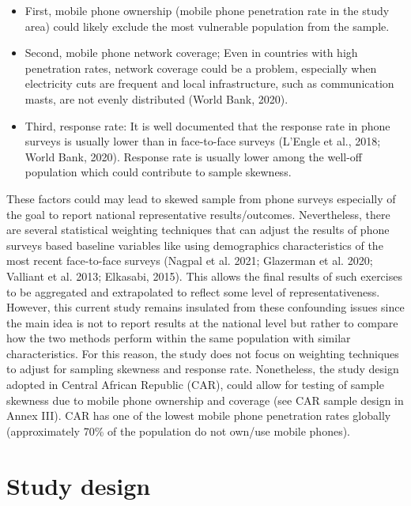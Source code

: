 \documentclass[11pt,harvard]{article}
\begin{document}
\begin{itemize}[label=--, left=1.5em]
\item[1]	First, mobile phone ownership (mobile phone penetration rate in the study area) could likely exclude the most vulnerable population from the sample. 

\item[2]	Second, mobile phone network coverage; Even in countries with high penetration rates, network coverage could be a problem, especially when electricity cuts are frequent and local infrastructure, such as communication masts, are not evenly distributed (World Bank, 2020).

\item[3]	Third, response rate: It is well documented that the response rate in phone surveys is usually lower than in face-to-face surveys (L’Engle et al., 2018; World Bank, 2020). Response rate is usually lower among the well-off population which could contribute to sample skewness.
\end{itemize}
 
These factors could may lead to skewed sample from phone surveys especially of the goal to report national representative results/outcomes. Nevertheless, there are several statistical weighting techniques that can adjust the results of phone surveys based baseline variables like using demographics characteristics of the most recent face-to-face surveys (Nagpal et al. 2021; Glazerman et al. 2020; Valliant et al. 2013; Elkasabi, 2015). This allows the final results of such exercises to be aggregated and extrapolated to reflect some level of representativeness. However, this current study remains insulated from these confounding issues since the main idea is not to report results at the national level but rather to compare how the two methods perform within the same population with similar characteristics. For this reason, the study does not focus on weighting techniques to adjust for sampling skewness and response rate. Nonetheless, the study design adopted in Central African Republic (CAR), could allow for testing of sample skewness due to mobile phone ownership and coverage (see CAR sample design in Annex III). CAR has one of the lowest mobile phone penetration rates globally (approximately 70\% of the population do not own/use mobile phones).

\pagebreak


\section{Study design}
\end{document}
